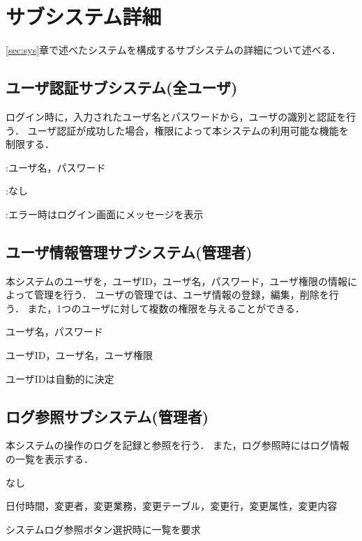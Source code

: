 

\section{サブシステム詳細}\label{subsys}
\ref{sec:sys}章で述べたシステムを構成するサブシステムの詳細について述べる．

\subsection{ユーザ認証サブシステム(全ユーザ)}
ログイン時に，入力されたユーザ名とパスワードから，ユーザの識別と認証を行う．
ユーザ認証が成功した場合，権限によって本システムの利用可能な機能を制限する．

\begin{description} \setlength{\leftskip}{0.5cm}
\item[入力]:ユーザ名，パスワード
\item[出力]:なし
\item[備考]:エラー時はログイン画面にメッセージを表示
\end{description}

\subsection{ユーザ情報管理サブシステム(管理者)}
本システムのユーザを，ユーザID，ユーザ名，パスワード，ユーザ権限の情報によって管理を行う．
ユーザの管理では、ユーザ情報の登録，編集，削除を行う．
また，1つのユーザに対して複数の権限を与えることができる．

\begin{description} \setlength{\leftskip}{0.5cm}
\item[入力]ユーザ名，パスワード
\item[出力]ユーザID，ユーザ名，ユーザ権限
\item[備考]ユーザIDは自動的に決定
\end{description}

\subsection{ログ参照サブシステム(管理者)}
本システムの操作のログを記録と参照を行う．
また，ログ参照時にはログ情報の一覧を表示する．
\begin{description} \setlength{\leftskip}{0.5cm}
\item[入力]なし
\item[出力]日付時間，変更者，変更業務，変更テーブル，変更行，変更属性，変更内容
\item[備考]システムログ参照ボタン選択時に一覧を要求
\end{description}

